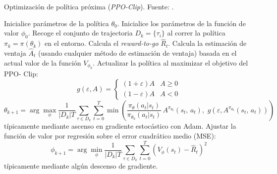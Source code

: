\begin{algorithm}[h]
\caption{Optimización de política próxima (\textit{PPO-Clip}). Fuente: \cite{PPObase}.}\label{alg:PPO}
\begin{algorithmic}[1]
\State Inicialice parámetros de la política $\theta_0$.
\State Inicialice los parámetros de la función de valor $\phi_0$.
	\State Recoge el conjunto de trajectoria $D_k=\{\tau_i\}$ al 			correr la política $\pi_k =\pi (\theta_k)$ en el entorno.
	\State Calcula el \textit{reward-to-go} $\hat{R}_t$.
	\State Calcula la estimación de ventaja $\hat{A}_t$ (usando 			cualquier método de estimación de ventaja) basada en el actual 			valor de la función $V_{\phi_k}$.
	\State Actualizar la política al maximizar el objetivo del PPO-			Clip:
	\[g(\varepsilon , A) = \begin{cases} 
        (1+\varepsilon)A & \text{$A\geq 0$} \\ 
        (1-\varepsilon)A & \text{$A < 0$}
        \end{cases}\]
    \[
    \theta_{k+1} = \arg \max_{\phi} \frac{1}{|D_k| T}\sum_{\tau\in 			D_k} \sum^T_{t=0} \min \left(\frac{\pi_{\theta}(a_t | s_t)}				{\pi_{\theta_k}(a_t | s_t)}\, A^{\pi_{\theta_k}}(s_t,\, a_t),\,\, 		g(\varepsilon, A^{\pi_{\theta_k}}(s_t,\, a_t)) \right)
    \]
    típicamente mediante ascenso en gradiente estocástico con Adam.
    \State Ajustar la función de valor por regresión sobre el error 		cuadrático medio (MSE):
    \[
	\phi_{k+1} = \arg\min_{\phi}\frac{1}{|D_k| T} \sum_{\tau\in 			D_k} \sum^T_{t=0} \left(V_{\phi}(s_t)-\hat{R}_t  \right)^2
    \]
    típicamente mediante algún descenso de gradiente.
\EndFor
\end{algorithmic}
\end{algorithm}

